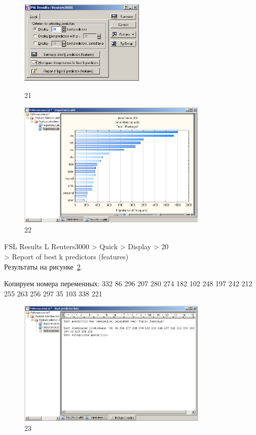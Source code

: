 \begin{figure}[!h]
  \centering

  \begin{minipage}{0.29\textwidth}
    \centering

    \includegraphics[height=4cm]
    {inc/21.PNG}

    \caption{21}

    \label{fig:21}
  \end{minipage}
  \begin{minipage}{0.69\textwidth}
    \centering

    \includegraphics[height=6cm]
    {inc/22.PNG}

    \caption{22}

    \label{fig:22}
  \end{minipage}
\end{figure}

\newpage

FSL Results L Reuters3000 > Quick > Display > 20 \\
> Report of best k predictors (features) \\

Результаты на рисунке~\ref{fig:23}.

Копируем номера переменных:
332 86 296 207 280 274 182 102 248 197 242 212 255 263 256 297 35 103 338 221

\begin{figure}[!h]
  \centering

  \includegraphics[height=6cm]
  {inc/23.PNG}

  \caption{23}

  \label{fig:23}
\end{figure}

